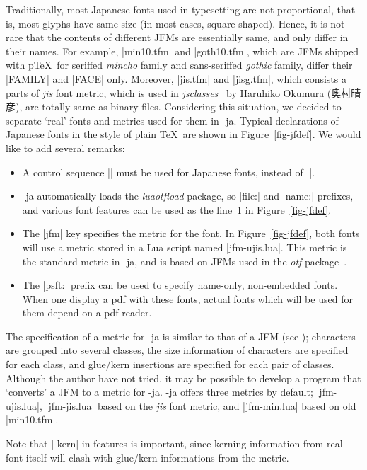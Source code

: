 \documentclass{ajt}
\begin{document}
Traditionally, most Japanese fonts used in typesetting are not
proportional, that is, most glyphs have same size (in most cases,
square-shaped). Hence, it is not rare that the contents of different
JFMs are essentially same, and only differ in their names. For example,
|min10.tfm| and |goth10.tfm|, which are JFMs shipped with p\TeX\ for
seriffed \emph{mincho} family and sans-seriffed \emph{gothic} family,
differ their |FAMILY| and |FACE| only. Moreover, |jis.tfm| and
|jisg.tfm|, which consists a parts of \emph{jis} font metric, which is
used in \emph{jsclasses}~\cite{jsclasses} by Haruhiko Okumura (奥村晴彦),
are totally same as binary files.  Considering this situation, we
decided to separate `real' fonts and metrics used for them in
\LuaTeX-ja. Typical declarations of Japanese fonts in the style of plain
\TeX\ are shown in Figure~\ref{fig-jfdef}. We would like to add several
remarks:
\begin{itemize}
\item A control sequence |\jfont| must be used for Japanese fonts, instead of |\font|.
\item \LuaTeX-ja automatically loads the \emph{luaotfload} package, so
      |file:| and |name:| prefixes, and various font features can be
      used as the line~1 in Figure~\ref{fig-jfdef}.
\item The |jfm| key specifies the metric for the font. In
      Figure~\ref{fig-jfdef}, both fonts will use a metric stored in a
      Lua script named |jfm-ujis.lua|. This metric is the standard
      metric in \LuaTeX-ja, and is based on JFMs used in the \emph{otf}
      package~\cite{otf}.
\item The |psft:| prefix can be used to specify name-only, non-embedded
      fonts. When one display a pdf with these fonts, actual fonts which
      will be used for them depend on a pdf reader. 
\end{itemize}
The specification of a metric for \LuaTeX-ja is similar to that of a JFM
(see \cite{ptexjp}); characters are grouped into several classes, the
size information of characters are specified for each class, and
glue/kern insertions are specified for each pair of classes. Although
the author have not tried, it may be possible to develop a program that
`converts' a JFM to a metric for \LuaTeX-ja.  \LuaTeX-ja offers three
metrics by default; |jfm-ujis.lua|, |jfm-jis.lua| based on the
\emph{jis} font metric, and |jfm-min.lua| based on old |min10.tfm|.

 Note that |-kern| in features
is important, since  kerning information from real font itself will
clash with glue/kern informations from the metric.
\end{document}
